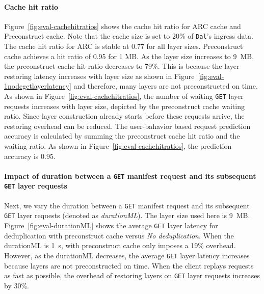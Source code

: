 \paragraph{Cache hit ratio}
Figure~\ref{fig:eval-cachehitratios} shows the cache hit ratio for ARC cache 
and Preconstruct cache.
Note that the cache size is set to 20\% of \texttt{Dal}'s ingress data.
The cache hit ratio for ARC is stable at 0.77 for all layer sizes.
Preconstruct cache achieves a hit ratio of 0.95 for 1 MB.
As the layer size increases to 9~MB, the preconstruct cache hit ratio decreases to 79\%. 
This is because the layer restoring latency increases with layer size as shown in Figure~\ref{fig:eval-1nodegetlayerlatency} and therefore, 
many layers are not preconstructed on time.
As shown in Figure~\ref{fig:eval-cachehitratios}, 
the number of waiting \texttt{GET} layer requests increases with layer size, depicted by the preconstruct cache waiting ratio.
Since layer construction already starts before these requests arrive, the restoring overhead can be reduced.
The user-bahavior based request prediction accuracy is calculated by summing the preconstruct cache hit ratio and the waiting ratio.
As shown in Figure~\ref{fig:eval-cachehitratios}, the prediction accuracy is 0.95.
 
\paragraph{Impact of duration between a \texttt{GET} manifest request and its subsequent \texttt{GET} layer requests}
Next, we vary the duration between a \texttt{GET} manifest request and its subsequent \texttt{GET} layer requests (denoted as \emph{durationML}).
The layer size used here is 9~MB.
%
Figure~\ref{fig:eval-durationML} shows the average \texttt{GET} layer latency for \sysname deduplication with preconstruct cache versus \emph{No deduplication}.
When the durationML is 1~s, \sysname with preconstruct cache only imposes a 19\% overhead.
However, as the durationML decreases, the average \texttt{GET} layer latency increases because layers are not preconstructed on time.
When the client replays requests as fast as possible, the overhead of restoring layers on \texttt{GET} layer requests increases by 30\%.


